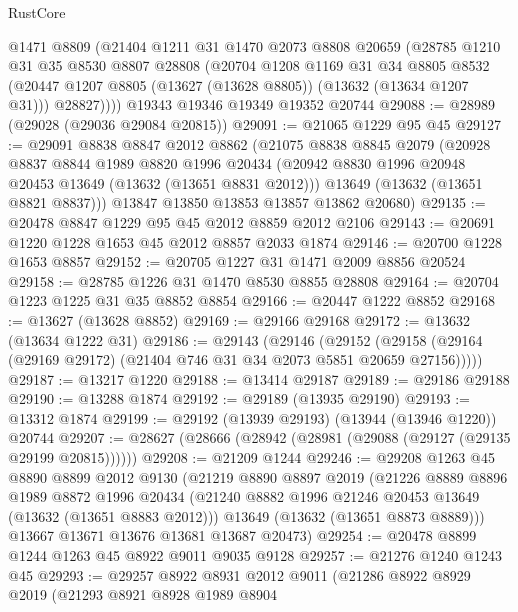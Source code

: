\begin{lexlean}{RustCore}
\begin{coremodule}
      @1471
      @8809
      (@21404
        @1211
        @31
        @1470
        @2073
        @8808
        @20659
        (@28785
          @1210
          @31
          @35
          @8530
          @8807
          @28808
          (@20704
            @1208
            @1169
            @31
            @34
            @8805
            @8532
            (@20447 @1207 @8805 (@13627 (@13628 @8805)) (@13632 (@13634 @1207 @31)))
            @28827))))
    @19343
    @19346
    @19349
    @19352
    @20744
@29088 := @28989 (@29028 (@29036 @29084 @20815))
@29091 := @21065 @1229 @95 @45
@29127 := @29091
    @8838
    @8847
    @2012
    @8862
    (@21075
      @8838
      @8845
      @2079
      (@20928
        @8837
        @8844
        @1989
        @8820
        @1996
        @20434
        (@20942 @8830 @1996 @20948 @20453 @13649 (@13632 (@13651 @8831 @2012)))
        @13649
        (@13632 (@13651 @8821 @8837)))
      @13847
      @13850
      @13853
      @13857
      @13862
      @20680)
@29135 := @20478 @8847 @1229 @95 @45 @2012 @8859 @2012 @2106
@29143 := @20691 @1220 @1228 @1653 @45 @2012 @8857 @2033 @1874
@29146 := @20700 @1228 @1653 @8857
@29152 := @20705 @1227 @31 @1471 @2009 @8856 @20524
@29158 := @28785 @1226 @31 @1470 @8530 @8855 @28808
@29164 := @20704 @1223 @1225 @31 @35 @8852 @8854
@29166 := @20447 @1222 @8852
@29168 := @13627 (@13628 @8852)
@29169 := @29166 @29168
@29172 := @13632 (@13634 @1222 @31)
@29186 := @29143
    (@29146
      (@29152 (@29158 (@29164 (@29169 @29172) (@21404 @746 @31 @34 @2073 @5851 @20659 @27156)))))
@29187 := @13217 @1220
@29188 := @13414 @29187
@29189 := @29186 @29188
@29190 := @13288 @1874
@29192 := @29189 (@13935 @29190)
@29193 := @13312 @1874
@29199 := @29192 (@13939 @29193) (@13944 (@13946 @1220)) @20744
@29207 := @28627 (@28666 (@28942 (@28981 (@29088 (@29127 (@29135 @29199 @20815))))))
@29208 := @21209 @1244
@29246 := @29208
    @1263
    @45
    @8890
    @8899
    @2012
    @9130
    (@21219
      @8890
      @8897
      @2019
      (@21226
        @8889
        @8896
        @1989
        @8872
        @1996
        @20434
        (@21240 @8882 @1996 @21246 @20453 @13649 (@13632 (@13651 @8883 @2012)))
        @13649
        (@13632 (@13651 @8873 @8889)))
      @13667
      @13671
      @13676
      @13681
      @13687
      @20473)
@29254 := @20478 @8899 @1244 @1263 @45 @8922 @9011 @9035 @9128
@29257 := @21276 @1240 @1243 @45
@29293 := @29257
    @8922
    @8931
    @2012
    @9011
    (@21286
      @8922
      @8929
      @2019
      (@21293
        @8921
        @8928
        @1989
        @8904

\end{coremodule}
\end{lexlean}
